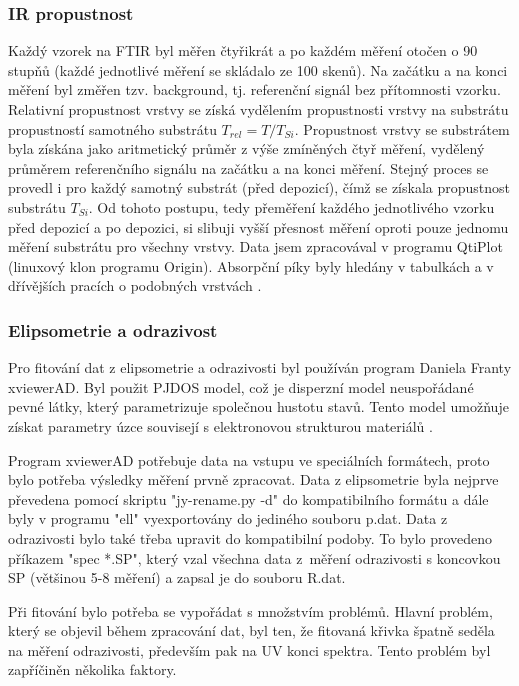 \documentclass[12pt,oneside,final]{fithesis2}
\begin{document}
\subsubsection{IR propustnost}
Každý vzorek na FTIR byl měřen čtyřikrát a po každém měření otočen o 90 stupňů (každé jednotlivé měření se skládalo ze 100 skenů). Na začátku a na konci měření byl změřen tzv. background, tj. referenční signál bez přítomnosti vzorku. Relativní propustnost vrstvy se získá vydělením propustnosti vrstvy na substrátu propustností samotného substrátu $T_{rel} = T / T_{Si}$. Propustnost vrstvy se substrátem byla získána jako aritmetický průměr z výše zmíněných čtyř měření, vydělený průměrem referenčního signálu na začátku a na konci měření. Stejný proces se provedl i pro každý samotný substrát (před depozicí), čímž se získala propustnost substrátu $T_{Si}$. Od tohoto postupu, tedy přeměření každého jednotlivého vzorku před depozicí a po depozici, si slibuji vyšší přesnost měření oproti pouze jednomu měření substrátu pro všechny vrstvy. Data jsem zpracovával v programu QtiPlot (linuxový klon programu Origin). Absorpční píky byly hledány v tabulkách \cite{mayo} a v dřívějších pracích o podobných vrstvách \cite{vasek, zajickova2007b}.

\subsubsection{Elipsometrie a odrazivost}
Pro fitování dat z elipsometrie a odrazivosti byl používán program Daniela Franty xviewerAD. Byl použit PJDOS model, což je disperzní model neuspořádané pevné látky, který parametrizuje společnou hustotu stavů. Tento model umožňuje získat parametry úzce souvisejí s elektronovou strukturou materiálů \cite{franta}.

Program xviewerAD potřebuje data na vstupu ve speciálních formátech, proto bylo potřeba výsledky měření prvně zpracovat. Data z elipsometrie byla nejprve převedena pomocí skriptu "jy-rename.py -d" do kompatibilního formátu a dále byly v programu "ell" vyexportovány do jediného souboru p.dat. Data z odrazivosti bylo také třeba upravit do kompatibilní podoby. To bylo provedeno příkazem "spec *.SP", který vzal všechna data z~měření odrazivosti s koncovkou SP (většinou 5-8 měření) a zapsal je do souboru R.dat. 

Při fitování bylo potřeba se vypořádat s množstvím problémů. Hlavní problém, který se objevil během zpracování dat, byl ten, že fitovaná křivka špatně seděla na měření odrazivosti, především pak na UV konci spektra. Tento problém byl zapříčiněn několika faktory. 
\end{document}
